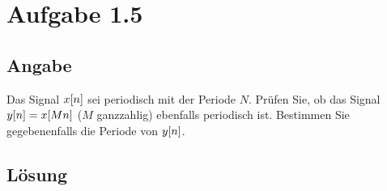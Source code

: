 \section*{Aufgabe 1.5}
\subsection*{Angabe}
Das Signal $x\negthinspace\left[n\right]$ sei periodisch mit der Periode $N$. Prüfen Sie, ob das Signal $y\negthinspace\left[n\right]=x\negthinspace\left[Mn\right]$ ($M$ ganzzahlig) ebenfalls periodisch ist. Bestimmen Sie gegebenenfalls die Periode von $y\negthinspace\left[n\right]$.
\subsection*{Lösung}
